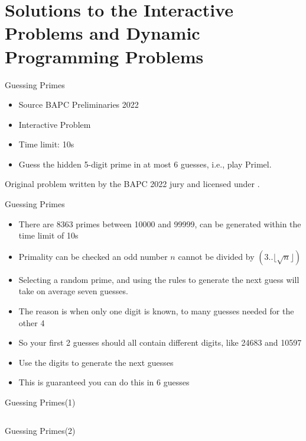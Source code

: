 \documentclass[11pt,pdf, aspectratio=169]{beamer}
\begin{document}
  \section{Solutions to the Interactive Problems and Dynamic Programming Problems}
  \begin{frame}{Guessing Primes}
    \begin{itemize}
      \item Source BAPC Preliminaries 2022
      \item Interactive Problem
      \item Time limit: 10s
      \item Guess the hidden 5-digit prime in at most 6 guesses, i.e., play Primel.

    \end{itemize}
    Original problem written by the BAPC 2022 jury and licensed under \doclicenseLongNameRef.

    \doclicenseImage
  \end{frame}
  \begin{frame}{Guessing Primes}
    \begin{itemize}
      \item<+-> There are 8363 primes between 10000 and 99999, can be generated within the time limit of 10s
      \item<+-> Primality can be checked an odd number $n$ cannot be divided by $(3..\lfloor\sqrt{n}\rfloor)$
      \item<+-> Selecting a random prime, and using the rules to generate the next guess will take on average seven guesses.
      \item<+-> The reason is when only one digit is known, to many guesses needed for the other 4
      \item<+-> So your first 2 guesses should all contain different digits, like 24683 and 10597
      \item<+-> Use the digits to generate the next guesses
      \item<+-> This is guaranteed you can do this in 6 guesses
    \end{itemize}
  \end{frame}
  \begin{frame}[containsverbatim]{Guessing Primes(1)}
    \inputminted[fontsize=\tiny]{python}{code/session-4/dapc-g-1.py}
  \end{frame}
  \begin{frame}[containsverbatim]{Guessing Primes(2)}
    \inputminted[fontsize=\tiny]{python}{code/session-4/dapc-g-2.py}
  \end{frame}
\end{document}

